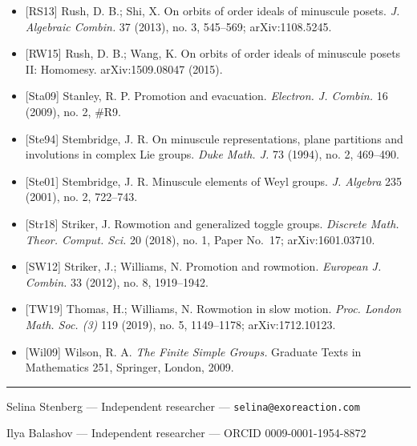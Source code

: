 \documentclass[
]{article}
\begin{document}
\begin{itemize}
\item
  {[}RS13{]} Rush, D. B.; Shi, X. On orbits of order ideals of minuscule
  posets. \emph{J. Algebraic Combin.} 37 (2013), no. 3, 545--569;
  arXiv:1108.5245.
\item
  {[}RW15{]} Rush, D. B.; Wang, K. On orbits of order ideals of
  minuscule posets II: Homomesy. arXiv:1509.08047 (2015).
\item
  {[}Sta09{]} Stanley, R. P. Promotion and evacuation. \emph{Electron.
  J. Combin.} 16 (2009), no. 2, \#R9.
\item
  {[}Ste94{]} Stembridge, J. R. On minuscule representations, plane
  partitions and involutions in complex Lie groups. \emph{Duke Math. J.}
  73 (1994), no. 2, 469--490.
\item
  {[}Ste01{]} Stembridge, J. R. Minuscule elements of Weyl groups.
  \emph{J. Algebra} 235 (2001), no. 2, 722--743.
\item
  {[}Str18{]} Striker, J. Rowmotion and generalized toggle groups.
  \emph{Discrete Math. Theor. Comput. Sci.} 20 (2018), no. 1, Paper
  No.~17; arXiv:1601.03710.
\item
  {[}SW12{]} Striker, J.; Williams, N. Promotion and rowmotion.
  \emph{European J. Combin.} 33 (2012), no. 8, 1919--1942.
\item
  {[}TW19{]} Thomas, H.; Williams, N. Rowmotion in slow motion.
  \emph{Proc. London Math. Soc. (3)} 119 (2019), no. 5, 1149--1178;
  arXiv:1712.10123.
\item
  {[}Wil09{]} Wilson, R. A. \emph{The Finite Simple Groups.} Graduate
  Texts in Mathematics 251, Springer, London, 2009.
\end{itemize}

\begin{center}\rule{0.5\linewidth}{0.5pt}\end{center}

Selina Stenberg --- Independent researcher ---
\texttt{selina@exoreaction.com}

Ilya Balashov --- Independent researcher --- ORCID 0009-0001-1954-8872
\end{document}
